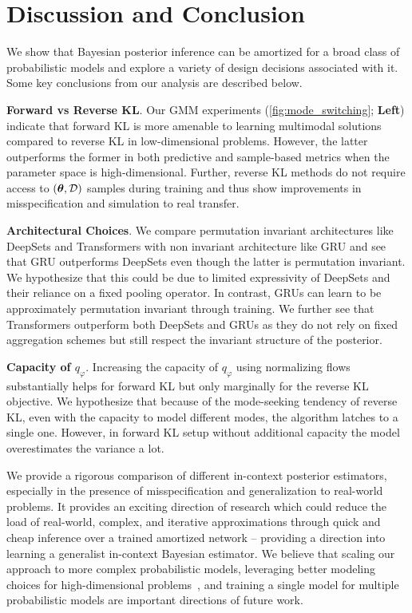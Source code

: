 \vspace{-3mm}
\section{Discussion and Conclusion}
\vspace{-2mm}
We show that Bayesian posterior inference can be amortized for a broad class of probabilistic models and explore a variety of design decisions associated with it. Some key conclusions from our analysis are described below.

\textbf{Forward vs Reverse KL}. Our GMM experiments (\cref{fig:mode_switching}; \textbf{Left}) indicate that forward KL is more amenable to learning multimodal solutions compared to reverse KL in low-dimensional problems. However, the latter outperforms the former in both predictive and sample-based metrics when the parameter space is high-dimensional. Further, reverse KL methods do not require access to $({\bm{\theta}}, {\mathcal{D}})$ samples during training and thus show improvements in misspecification and simulation to real transfer.

\textbf{Architectural Choices}. We compare permutation invariant architectures like DeepSets and Transformers with non invariant architecture like GRU and see that GRU outperforms DeepSets even though the latter is permutation invariant. We hypothesize that this could be due to limited expressivity of DeepSets and their reliance on a fixed pooling operator. In contrast, GRUs can learn to be approximately permutation invariant through training. We further see that Transformers outperform both DeepSets and GRUs as they do not rely on fixed aggregation schemes but still respect the invariant structure of the posterior.

\textbf{Capacity of $q_\varphi$}. Increasing the capacity of $q_\varphi$ using normalizing flows substantially helps for forward KL but only marginally for the reverse KL objective. We hypothesize that because of the mode-seeking tendency of reverse KL, even with the capacity to model different modes, the algorithm latches to a single one. However, in forward KL setup without additional capacity the model overestimates the variance a lot.

We provide a rigorous comparison of different in-context posterior estimators, especially in the presence of misspecification and generalization to real-world problems. It provides an exciting direction of research which could reduce the load of real-world, complex, and iterative approximations through quick and cheap inference over a trained amortized network -- providing a direction into learning a generalist in-context Bayesian estimator. We believe that scaling our approach to more complex probabilistic models, leveraging better modeling choices for high-dimensional problems~\citep{bengio2021flow,zhang2021path,vargas2023denoising}, and training a single model for multiple probabilistic models are important directions of future work.